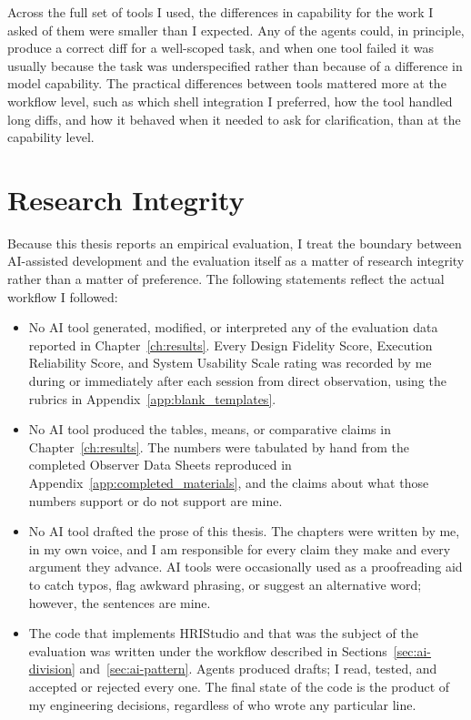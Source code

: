 Across the full set of tools I used, the differences in capability for the work I asked of them were smaller than I expected. Any of the agents could, in principle, produce a correct diff for a well-scoped task, and when one tool failed it was usually because the task was underspecified rather than because of a difference in model capability. The practical differences between tools mattered more at the workflow level, such as which shell integration I preferred, how the tool handled long diffs, and how it behaved when it needed to ask for clarification, than at the capability level.

\section{Research Integrity}
\label{sec:ai-integrity}

Because this thesis reports an empirical evaluation, I treat the boundary between AI-assisted development and the evaluation itself as a matter of research integrity rather than a matter of preference. The following statements reflect the actual workflow I followed:

\begin{itemize}
\item No AI tool generated, modified, or interpreted any of the evaluation data reported in Chapter~\ref{ch:results}. Every Design Fidelity Score, Execution Reliability Score, and System Usability Scale rating was recorded by me during or immediately after each session from direct observation, using the rubrics in Appendix~\ref{app:blank_templates}.

\item No AI tool produced the tables, means, or comparative claims in Chapter~\ref{ch:results}. The numbers were tabulated by hand from the completed Observer Data Sheets reproduced in Appendix~\ref{app:completed_materials}, and the claims about what those numbers support or do not support are mine.

\item No AI tool drafted the prose of this thesis. The chapters were written by me, in my own voice, and I am responsible for every claim they make and every argument they advance. AI tools were occasionally used as a proofreading aid to catch typos, flag awkward phrasing, or suggest an alternative word; however, the sentences are mine.

\item The code that implements HRIStudio and that was the subject of the evaluation was written under the workflow described in Sections~\ref{sec:ai-division} and~\ref{sec:ai-pattern}. Agents produced drafts; I read, tested, and accepted or rejected every one. The final state of the code is the product of my engineering decisions, regardless of who wrote any particular line.
\end{itemize}

